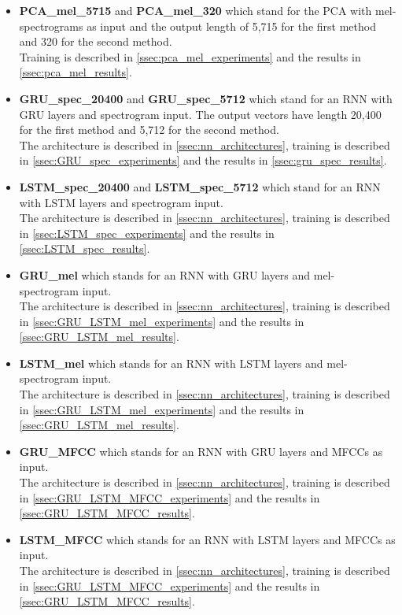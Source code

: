 \begin{itemize}
    \item \textbf{PCA\_mel\_5715} and \textbf{PCA\_mel\_320} which stand for the PCA with mel-spectrograms as input and the output length of 5,715 for the first method and 320 for the second method. \\
        Training is described in \ref{ssec:pca_mel_experiments} and the results in \ref{ssec:pca_mel_results}.
    \item \textbf{GRU\_spec\_20400} and \textbf{GRU\_spec\_5712} which stand for an RNN with GRU layers and spectrogram input. The output vectors have length 20,400 for the first method and 5,712 for the second method. \\
    The architecture is described in \ref{ssec:nn_architectures}, training is described in \ref{ssec:GRU_spec_experiments} and the results in \ref{ssec:gru_spec_results}.
    \item \textbf{LSTM\_spec\_20400} and \textbf{LSTM\_spec\_5712} which stand for an RNN with LSTM layers and spectrogram input. \\
        The architecture is described in \ref{ssec:nn_architectures}, training is described in \ref{ssec:LSTM_spec_experiments} and the results in \ref{ssec:LSTM_spec_results}.
    \item \textbf{GRU\_mel} which stands for an RNN with GRU layers and mel- spectrogram input. \\
        The architecture is described in \ref{ssec:nn_architectures}, training is described in \ref{ssec:GRU_LSTM_mel_experiments} and the results in \ref{ssec:GRU_LSTM_mel_results}.
    \item \textbf{LSTM\_mel} which stands for an RNN with LSTM layers and mel- spectrogram input. \\
    The architecture is described in \ref{ssec:nn_architectures}, training is described in \ref{ssec:GRU_LSTM_mel_experiments} and the results in \ref{ssec:GRU_LSTM_mel_results}.
    \item \textbf{GRU\_MFCC} which stands for an RNN with GRU layers and MFCCs as input. \\
        The architecture is described in \ref{ssec:nn_architectures}, training is described in \ref{ssec:GRU_LSTM_MFCC_experiments} and the results in \ref{ssec:GRU_LSTM_MFCC_results}.
    \item \textbf{LSTM\_MFCC} which stands for an RNN with LSTM layers and MFCCs as input. \\
        The architecture is described in \ref{ssec:nn_architectures}, training is described in \ref{ssec:GRU_LSTM_MFCC_experiments} and the results in \ref{ssec:GRU_LSTM_MFCC_results}.

    
\end{itemize}

